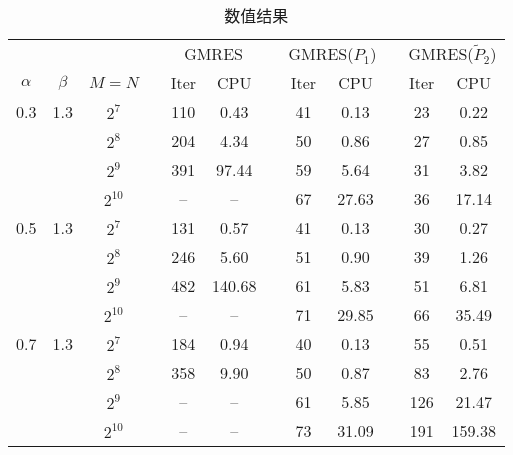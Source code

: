 \documentclass{ecnumaster}
\begin{document}
\begin{table}[H]
\centering
\caption{数值结果} \label{tab4-2-1}
\begin{tabular}{cccccccccccc} \toprule
& &  && \multicolumn{2}{c}{GMRES} && \multicolumn{2}{c}{GMRES($P_1$)}
&& \multicolumn{2}{c}{GMRES($\tilde{P}_2$)} \\
$\alpha$ & $\beta$ & $M = N$ && Iter & CPU && Iter & CPU && Iter & CPU\\ \midrule
0.3 & 1.3
 & $2^7$    && 110 & 0.43   && 41 & 0.13  && 23  & 0.22  \\
&& $2^8$    && 204 & 4.34   && 50 & 0.86  && 27  & 0.85  \\
&& $2^9$    && 391 & 97.44  && 59 & 5.64  && 31  & 3.82  \\
&& $2^{10}$ && --  & --     && 67 & 27.63 && 36  & 17.14   \\  \midrule
0.5 & 1.3
 & $2^7$    && 131 & 0.57   && 41 & 0.13  && 30  & 0.27   \\
&& $2^8$    && 246 & 5.60   && 51 & 0.90  && 39  & 1.26   \\
&& $2^9$    && 482 & 140.68 && 61 & 5.83  && 51  & 6.81   \\
&& $2^{10}$ && --  & --     && 71 & 29.85 && 66  & 35.49   \\ \midrule
0.7 & 1.3
 & $2^7$    && 184 & 0.94   && 40 & 0.13  && 55  & 0.51   \\
&& $2^8$    && 358 & 9.90   && 50 & 0.87  && 83  & 2.76   \\
&& $2^9$    && --  & --     && 61 & 5.85  && 126 & 21.47  \\
&& $2^{10}$ && --  & --     && 73 &31.09  && 191 & 159.38  \\ \bottomrule
\end{tabular}
\end{table}
\end{document}
